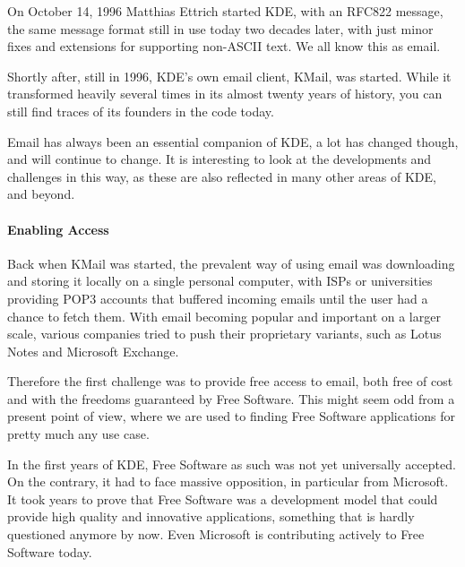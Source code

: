 

\noindent{}On October 14, 1996 Matthias Ettrich started KDE, with an RFC822 message, the same message format still in use today two decades later, with just minor fixes and extensions for supporting non-ASCII text. We all know this as email.

Shortly after, still in 1996, KDE's own email client, KMail, was started. While it transformed heavily several times in its almost twenty years of history, you can still find traces of its founders in the code today.

Email has always been an essential companion of KDE, a lot has changed though, and will continue to change. It is interesting to look at the developments and challenges in this way, as these are also reflected in many other areas of KDE, and beyond.

\paragraph{Enabling Access}

Back when KMail was started, the prevalent way of using email was downloading and storing it locally on a single personal computer, with ISPs or universities providing POP3 accounts that buffered incoming emails until the user had a chance to fetch them. With email becoming popular and important on a larger scale, various companies tried to push their proprietary variants, such as Lotus Notes and Microsoft Exchange.

Therefore the first challenge was to provide free access to email, both free of cost and with the freedoms guaranteed by Free Software. This might seem odd from a present point of view, where we are used to finding Free Software applications for pretty much any use case.

In the first years of KDE, Free Software as such was not yet universally accepted. On the contrary, it had to face massive opposition, in particular from Microsoft. It took years to prove that Free Software was a development model that could provide high quality and innovative applications, something that is hardly questioned anymore by now. Even Microsoft is contributing actively to Free Software today.

